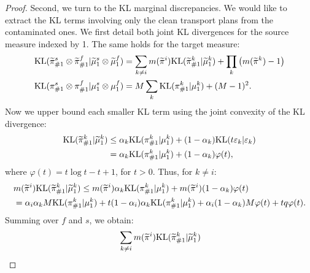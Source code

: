 \begin{proof}
  Second, we turn to the KL marginal discrepancies. We would like to extract the KL terms
  involving only the clean transport plans from the contaminated ones.
  We first detail both joint KL divergences for the source measure indexed by 1.
  The same holds for the target measure:
    \begin{equation}
    \label{seq:kl-split}
    \begin{split}
      &\text{KL}(\widetilde{\pi}^s_{\#1} \otimes \widetilde{\pi}^f_{\#1} \vert \widetilde{\mu}^s_1 \otimes \widetilde{\mu}^f_1) =
      \sum_{k \neq i} m(\widetilde{\pi}^i) \text{KL}(\widetilde{\pi}^k_{\#1} \vert \widetilde{\mu}^k_1) +
      \prod_{k} \big( m(\widetilde{\pi}^k) - 1 \big)\\
      &
      \text{KL}(\pi^s_{\#1} \otimes \pi^f_{\#1} \vert \mu^s_1 \otimes \mu^f_1) =
    M \sum_k \text{KL}(\pi^k_{\#1} \vert \mu^k_1) + (M-1)^2.
      \end{split}
    \end{equation}
    Now we upper bound each smaller KL term using the joint convexity of the KL divergence:
    \begin{equation}
      \begin{split}
        \text{KL}(\widetilde{\pi}^k_{\#1} \vert \widetilde{\mu}^k_1) &\leq
        \alpha_k \text{KL}(\pi^k_{\#1} \vert \mu^k_1) + (1 - \alpha_k) \text{KL}(t \varepsilon_k \vert \varepsilon_k) \\
        &= \alpha_k \text{KL}(\pi^k_{\#1} \vert \mu^k_1) + (1 - \alpha_k) \varphi(t),
      \end{split}
    \end{equation}
    where $\varphi(t) = t \log t - t + 1$, for $t > 0$. Thus, for $k\neq i$:
    \begin{equation}
      \begin{split}
        &m(\widetilde{\pi}^i) \text{KL}(\widetilde{\pi}^k_{\#1} \vert \widetilde{\mu}^k_1)
        \leq m(\widetilde{\pi}^i) \alpha_k \text{KL}(\pi^k_{\#1} \vert \mu^k_1)
        + m(\widetilde{\pi}^i) (1 - \alpha_k) \varphi(t) \\
        &= \alpha_i\alpha_k M \text{KL}(\pi^k_{\#1} \vert \mu^k_1)
        + t (1-\alpha_i) \alpha_k \text{KL}(\pi^k_{\#1} \vert \mu^k_1)
        + \alpha_i(1-\alpha_k) M \varphi(t) + t q\varphi(t).
      \end{split}
    \end{equation}
    Summing over $f$ and $s$, we obtain:
    \begin{equation}
      \begin{split}
        &\sum_{k \neq i} m(\widetilde{\pi}^i) \kl(\widetilde{\pi}^k_{\#1} \vert \widetilde{\mu}^k_1) \\

\end{split}
\end{equation}
\end{proof}
